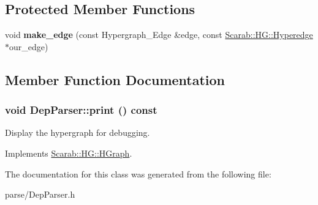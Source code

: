 \subsection*{Protected Member Functions}
\begin{DoxyCompactItemize}
\item 
\hypertarget{class_dep_parser_a04d313d931d1e8b0bac3a36ca7be469b}{
void {\bfseries make\_\-edge} (const Hypergraph\_\-Edge \&edge, const \hyperlink{class_scarab_1_1_h_g_1_1_hyperedge}{Scarab::HG::Hyperedge} $\ast$our\_\-edge)}
\label{class_dep_parser_a04d313d931d1e8b0bac3a36ca7be469b}

\end{DoxyCompactItemize}


\subsection{Member Function Documentation}
\hypertarget{class_dep_parser_a9aebbbde821bad423b6c01cc12f02a2c}{
\subsubsection[{print}]{\setlength{\rightskip}{0pt plus 5cm}void DepParser::print () const}}
\label{class_dep_parser_a9aebbbde821bad423b6c01cc12f02a2c}
Display the hypergraph for debugging. 

Implements \hyperlink{class_scarab_1_1_h_g_1_1_h_graph_ab5aa11c932b28864b56f28e0babbc1c1}{Scarab::HG::HGraph}.



The documentation for this class was generated from the following file:\begin{DoxyCompactItemize}
\item 
parse/DepParser.h\end{DoxyCompactItemize}
